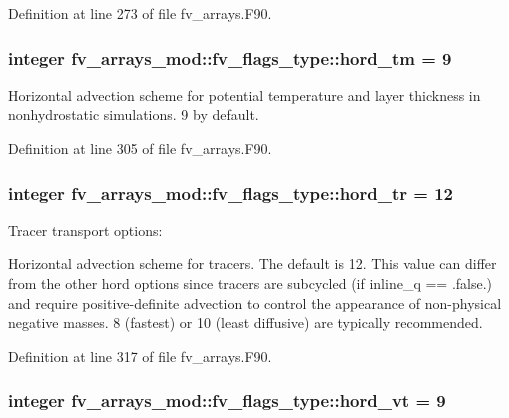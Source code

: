 Definition at line 273 of file fv\-\_\-arrays.\-F90.

\subsubsection[{hord\-\_\-tm}]{\setlength{\rightskip}{0pt plus 5cm}integer fv\-\_\-arrays\-\_\-mod\-::fv\-\_\-flags\-\_\-type\-::hord\-\_\-tm = 9}\label{structfv__arrays__mod_1_1fv__flags__type_aec43383385030681d8c19c8e906adc1e}


Horizontal advection scheme for potential temperature and layer thickness in nonhydrostatic simulations. 9 by default. 



Definition at line 305 of file fv\-\_\-arrays.\-F90.

\subsubsection[{hord\-\_\-tr}]{\setlength{\rightskip}{0pt plus 5cm}integer fv\-\_\-arrays\-\_\-mod\-::fv\-\_\-flags\-\_\-type\-::hord\-\_\-tr = 12}\label{structfv__arrays__mod_1_1fv__flags__type_a6b189bf4be82ed34b367f1a7a6fa1106}


Tracer transport options\-: 

Horizontal advection scheme for tracers. The default is 12. This value can differ from the other hord options since tracers are subcycled (if inline\-\_\-q == .false.) and require positive-\/definite advection to control the appearance of non-\/physical negative masses. 8 (fastest) or 10 (least diffusive) are typically recommended. 

Definition at line 317 of file fv\-\_\-arrays.\-F90.

\subsubsection[{hord\-\_\-vt}]{\setlength{\rightskip}{0pt plus 5cm}integer fv\-\_\-arrays\-\_\-mod\-::fv\-\_\-flags\-\_\-type\-::hord\-\_\-vt = 9}\label{structfv__arrays__mod_1_1fv__flags__type_adfb527dd9d1387bc79c721bc9810c410}


